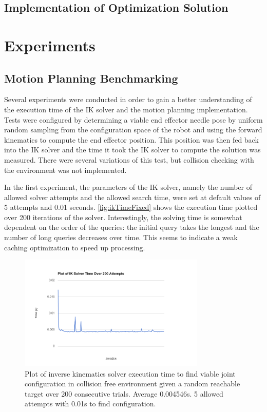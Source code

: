 \documentclass[12pt]{report}
\begin{document}
\section{Implementation of Optimization Solution}

\chapter{Experiments}
\section{Motion Planning Benchmarking}
Several experiments were conducted in order to gain a better understanding of the execution time of the IK solver and the motion planning implementation. Tests were configured by determining a viable end effector needle pose by uniform random sampling from the configuration space of the robot and using the forward kinematics to compute the end effector position. This position was then fed back into the IK solver and the time it took the IK solver to compute the solution was measured. There were several variations of this test, but collision checking with the environment was not implemented.

In the first experiment, the parameters of the IK solver, namely the number of allowed solver attempts and the allowed search time, were set at default values of 5 attempts and 0.01 seconds. \autoref{fig:ikTimeFixed} shows the execution time plotted over 200 iterations of the solver. Interestingly, the solving time is somewhat dependent on the order of the queries: the initial query takes the longest and the number of long queries decreases over time. This seems to indicate a weak caching optimization to speed up processing.

\begin{figure}[thpb]
	\centering
	\includegraphics[width = 3.5in]{graphs/ik_solver_fixed_stats.png}
    \caption{Plot of inverse kinematics solver execution time to find viable joint configuration in collision free environment given a random reachable target over 200 consecutive trials. Average 0.004546s. 5 allowed attempts with 0.01s to find configuration.}
    \label{fig:ikTimeFixed}
\end{figure}
\end{document}
